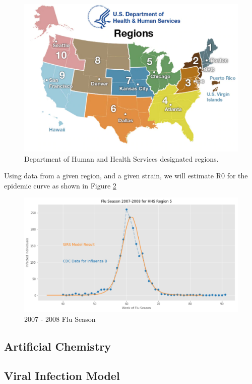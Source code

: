 \documentclass[11pt]{article}
\begin{document}
\begin{figure}
\includegraphics[width=\textwidth]{figs/regionsmap.pdf}
\caption{Department of Human and Health Services designated regions.}
\label{Fig:Regions}
\end{figure}

Using data from a given region, and a given strain, we will estimate R0 for the epidemic curve as shown in Figure \ref{Fig:R0}

\begin{figure}
\includegraphics[width=\textwidth]{figs/2007-2008-SIRS.pdf}
\caption{2007 - 2008 Flu Season}
\label{Fig:R0}
\end{figure}

\subsection{Artificial Chemistry}

\subsection{Viral Infection Model}
\end{document}
